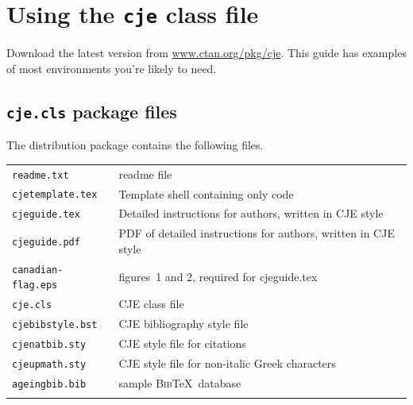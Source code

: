 \documentclass{cje}          %
\theoremstyle{plain}%
\theoremstyle{definition}
\theoremstyle{remark}
\begin{document}
\maketitle

\section{Using the \texttt{cje} class file}
Download the latest version from \url{www.ctan.org/pkg/cje}. This guide has examples of most environments you're likely to need. 

\subsection{\texttt{cje.cls} package files}
The distribution package contains the following files.\\[0.5\baselineskip]
\begin{tabular}{@{}ll}
\texttt{readme.txt}        & readme file\\
\texttt{cjetemplate.tex}      & Template shell containing only code\\
\texttt{cjeguide.tex}      & Detailed instructions for authors, written in CJE style\\
\texttt{cjeguide.pdf}      & PDF of detailed instructions for authors, written in CJE style\\
\texttt{canadian-flag.eps} & figures~1 and 2, required for cjeguide.tex\\
\texttt{cje.cls}           & CJE class file\\
\texttt{cjebibstyle.bst}           & CJE bibliography style file\\
\texttt{cjenatbib.sty}     & CJE style file for citations\\
\texttt{cjeupmath.sty}     & CJE style file for non-italic Greek characters\\
\texttt{ageingbib.bib}     & sample \textsc{Bib}\TeX\ database\\ 
\mbox{}\\
\end{tabular}
\end{document}
